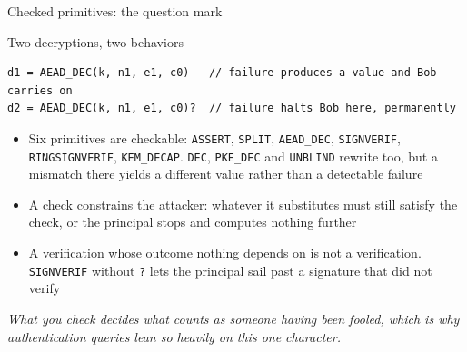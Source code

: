\ifdefined\PRESENTATION\else\PassOptionsToClass{handout}{beamer}\fi\documentclass[aspectratio=169, lualatex]{beamer}
\begin{document}
\begin{frame}[fragile]{Checked primitives: the question mark}
	\begin{vpmodel}{Two decryptions, two behaviors}
		\begin{lstlisting}
d1 = AEAD_DEC(k, n1, e1, c0)   // failure produces a value and Bob carries on
d2 = AEAD_DEC(k, n1, e1, c0)?  // failure halts Bob here, permanently
\end{lstlisting}
	\end{vpmodel}
	\vspace{0.3em}
	\begin{itemize}
		\item Six primitives are checkable: \texttt{ASSERT}, \texttt{SPLIT}, \texttt{AEAD\_DEC}, \texttt{SIGNVERIF}, \texttt{RINGSIGNVERIF}, \texttt{KEM\_DECAP}. \texttt{DEC}, \texttt{PKE\_DEC} and \texttt{UNBLIND} rewrite too, but a mismatch there yields a different value rather than a detectable failure
		\item A check constrains the attacker: whatever it substitutes must still satisfy the check, or the principal stops and computes nothing further
		\item A verification whose outcome nothing depends on is not a verification. \texttt{SIGNVERIF} without \texttt{?} lets the principal sail past a signature that did not verify
	\end{itemize}
	\vspace{0.4em}
	\begin{center}
		\textit{What you check decides what counts as someone having been fooled, which is why authentication queries lean so heavily on this one character.}
	\end{center}
\end{frame}
\end{document}
